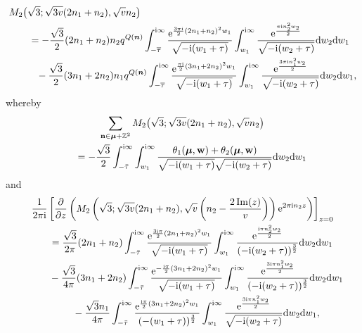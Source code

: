 \documentclass[pdftex]{sigma}
\def\BZ{\mathbb{Z}}
\theoremstyle{definition}
\numberwithin{equation}{section}
\begin{document}
\begin{align*}%
	&M_2\bigl(\sqrt{3};\sqrt{3v}(2n_1+n_2),\sqrt{v}n_2\bigr)\\
	&\qquad=-\frac{\sqrt{3}}{2}(2n_1+n_2)n_2q^{Q(\boldsymbol{n})}\int_{-\overline{\tau}}^{{\rm i} \infty}
	\frac{{\rm e}^{\frac{3\pi {\rm i}}{2}(2n_1+n_2)^2w_1}}{\sqrt{-{\rm i}(w_1+\tau)}}\int_{w_1}^{{\rm i} \infty}
	\frac{{\rm e}^{\frac{\pi {\rm i} n_2^2 w_2}{2}}}{\sqrt{-{\rm i}(w_2+\tau)}}{\rm d}w_2 {\rm d}w_1
	\\
	&\phantom{\qquad=}{}
	-\frac{\sqrt{3}}{2}(3n_1+2n_2)n_1q^{Q(\boldsymbol{n})} \int_{-\overline{\tau}}^{{\rm i} \infty}
	\frac{{\rm e}^{\frac{\pi {\rm i}}{2}(3n_1+2n_2)^2w_1}}{\sqrt{-{\rm i}(w_1+\tau)}}
	\int_{w_1}^{{\rm i} \infty}
	\frac{{\rm e}^{\frac{3\pi {\rm i} n_1^2 w_2}{2}}}{\sqrt{-{\rm i}(w_2+\tau)}}{\rm d}w_2 {\rm d}w_1,
\end{align*}
whereby
\begin{gather*}%
	\sum_{\mathbf{n} \in \boldsymbol{\mu} + \BZ^2}
	M_2\bigl(\sqrt{3};\sqrt{3v}(2n_1+n_2),\sqrt{v}n_2\bigr)
	\\
	\qquad= -\frac{\sqrt{3}}{2}\int_{-\bar{\tau}}^{{\rm i} \infty}
	\int_{w_1}^{{\rm i} \infty}\frac{\theta_1({\boldsymbol\mu},
		{\bf w})+\theta_2({\boldsymbol\mu},
		{\bf w})}{\sqrt{-{\rm i}(w_1+\tau)}\sqrt{-{\rm i}(w_2+\tau)}}{\rm d}w_2{\rm d}w_1
\end{gather*}
and
\begin{gather*}%
	\frac{1}{2\pi {\rm i}}\left[\frac{\partial}{\partial z}\left(M_2\left(\sqrt 3;\sqrt{3v}(2n_1+n_2),\sqrt{v}\left(n_2-\frac{2\operatorname{Im}(z)}{v}\right)\right){\rm e}^{2\pi {\rm i}n_2z}\right)\right]_{z=0}\\
	\qquad=\frac{\sqrt{3}}{2\pi}(2n_1+n_2)\int_{-\bar{\tau}}^{{\rm i}\infty} \frac{{\rm e}^{\frac{3{\rm i}\pi}{2}(2n_1+n_2)^2w_1}}{\sqrt{-{\rm i}(w_1+\tau)}}\int_{w_1}^{{\rm i}\infty} \frac{{\rm e}^{\frac{{\rm i}\pi n_2^2w_2}{2}}}{(-{\rm i}(w_2+\tau))^{\frac32}}{\rm d}w_2{\rm d}w_1\\
	\qquad\phantom{=}{}-\frac{\sqrt{3}}{4\pi}(3n_1+2n_2)\int_{-\bar{\tau}}^{{\rm i}\infty} \frac{{\rm e}^{-\frac{{\rm i}\pi}{2}(3n_1+2n_2)^2w_1}}{\sqrt{-{\rm i}(w_1+\tau)}}\int_{w_1}^{{\rm i}\infty} \frac{{\rm e}^{\frac{3{\rm i}\pi n_1^2w_2}{2}}}{(-{\rm i}(w_2+\tau))^{\frac32}}{\rm d}w_2{\rm d}w_1\\
	\qquad\phantom{=}{}-\frac{\sqrt{3}n_1}{4\pi}\int_{-\bar{\tau}}^{{\rm i}\infty} \frac{{\rm e}^{\frac{{\rm i}\pi}{2}(3n_1+2n_2)^2w_1}}{(-(w_1+\tau))^\frac32}\int_{w_1}^{{\rm i}\infty}\frac{{\rm e}^{\frac{3{\rm i}\pi n_1^2w_2}{2}}}{\sqrt{-{\rm i}(w_2+\tau)}}{\rm d}w_2{\rm d}w_1,
\end{gather*}
\end{document}
